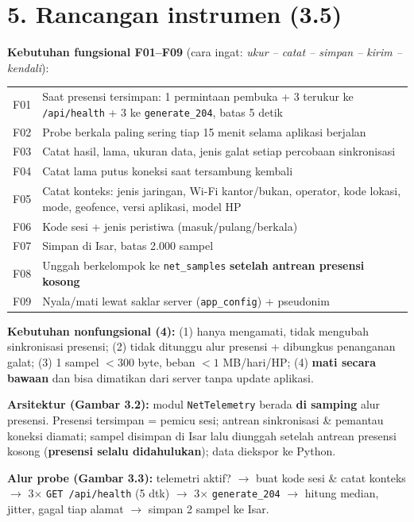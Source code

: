 \section*{5. Rancangan instrumen (3.5)}
\textbf{Kebutuhan fungsional F01--F09} (cara ingat: \textit{ukur -- catat -- simpan -- kirim -- kendali}):
\begin{center}\small
\begin{tabularx}{\linewidth}{@{}lX@{}}
\toprule
F01 & Saat presensi tersimpan: 1 permintaan pembuka + 3 terukur ke \texttt{/api/health} + 3 ke \texttt{generate\_204}, batas 5 detik\\
F02 & Probe berkala paling sering tiap 15 menit selama aplikasi berjalan\\
F03 & Catat hasil, lama, ukuran data, jenis galat setiap percobaan sinkronisasi\\
F04 & Catat lama putus koneksi saat tersambung kembali\\
F05 & Catat konteks: jenis jaringan, Wi-Fi kantor/bukan, operator, kode lokasi, mode, geofence, versi aplikasi, model HP\\
F06 & Kode sesi + jenis peristiwa (masuk/pulang/berkala)\\
F07 & Simpan di Isar, batas 2.000 sampel\\
F08 & Unggah berkelompok ke \texttt{net\_samples} \textbf{setelah antrean presensi kosong}\\
F09 & Nyala/mati lewat saklar server (\texttt{app\_config}) + pseudonim\\
\bottomrule
\end{tabularx}
\end{center}
\textbf{Kebutuhan nonfungsional (4):} (1) hanya mengamati, tidak mengubah sinkronisasi presensi; (2) tidak ditunggu alur presensi + dibungkus penanganan galat; (3) 1 sampel $<300$ byte, beban $<1$ MB/hari/HP; (4) \textbf{mati secara bawaan} dan bisa dimatikan dari server tanpa update aplikasi.

\textbf{Arsitektur (Gambar 3.2):} modul \texttt{NetTelemetry} berada \textbf{di samping} alur presensi. Presensi tersimpan = pemicu sesi; antrean sinkronisasi \& pemantau koneksi diamati; sampel disimpan di Isar lalu diunggah setelah antrean presensi kosong (\textbf{presensi selalu didahulukan}); data diekspor ke Python.

\textbf{Alur probe (Gambar 3.3):} telemetri aktif? $\rightarrow$ buat kode sesi \& catat konteks $\rightarrow$ 3$\times$ \texttt{GET /api/health} (5 dtk) $\rightarrow$ 3$\times$ \texttt{generate\_204} $\rightarrow$ hitung median, jitter, gagal tiap alamat $\rightarrow$ simpan 2 sampel ke Isar.

